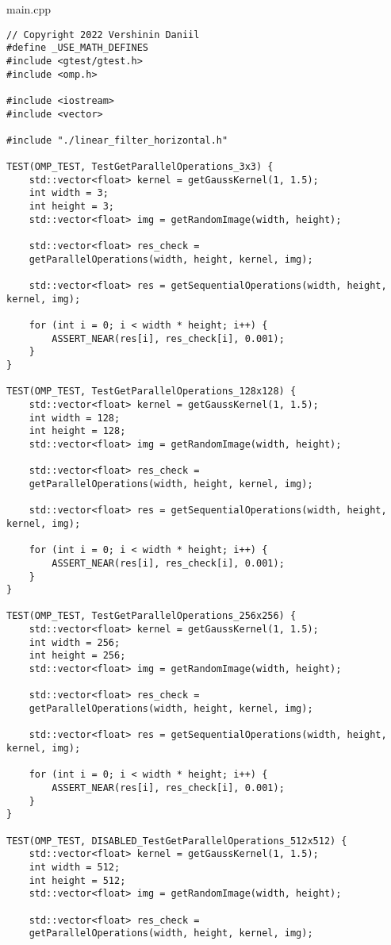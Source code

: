\documentclass{report}
\begin{document}
main.cpp
\begin{lstlisting}
// Copyright 2022 Vershinin Daniil
#define _USE_MATH_DEFINES
#include <gtest/gtest.h>
#include <omp.h>

#include <iostream>
#include <vector>

#include "./linear_filter_horizontal.h"

TEST(OMP_TEST, TestGetParallelOperations_3x3) {
	std::vector<float> kernel = getGaussKernel(1, 1.5);
	int width = 3;
	int height = 3;
	std::vector<float> img = getRandomImage(width, height);
	
	std::vector<float> res_check =
	getParallelOperations(width, height, kernel, img);
	
	std::vector<float> res = getSequentialOperations(width, height, kernel, img);
	
	for (int i = 0; i < width * height; i++) {
		ASSERT_NEAR(res[i], res_check[i], 0.001);
	}
}

TEST(OMP_TEST, TestGetParallelOperations_128x128) {
	std::vector<float> kernel = getGaussKernel(1, 1.5);
	int width = 128;
	int height = 128;
	std::vector<float> img = getRandomImage(width, height);
	
	std::vector<float> res_check =
	getParallelOperations(width, height, kernel, img);
	
	std::vector<float> res = getSequentialOperations(width, height, kernel, img);
	
	for (int i = 0; i < width * height; i++) {
		ASSERT_NEAR(res[i], res_check[i], 0.001);
	}
}

TEST(OMP_TEST, TestGetParallelOperations_256x256) {
	std::vector<float> kernel = getGaussKernel(1, 1.5);
	int width = 256;
	int height = 256;
	std::vector<float> img = getRandomImage(width, height);
	
	std::vector<float> res_check =
	getParallelOperations(width, height, kernel, img);
	
	std::vector<float> res = getSequentialOperations(width, height, kernel, img);
	
	for (int i = 0; i < width * height; i++) {
		ASSERT_NEAR(res[i], res_check[i], 0.001);
	}
}

TEST(OMP_TEST, DISABLED_TestGetParallelOperations_512x512) {
	std::vector<float> kernel = getGaussKernel(1, 1.5);
	int width = 512;
	int height = 512;
	std::vector<float> img = getRandomImage(width, height);
	
	std::vector<float> res_check =
	getParallelOperations(width, height, kernel, img);
	

\end{lstlisting}
\end{document}
